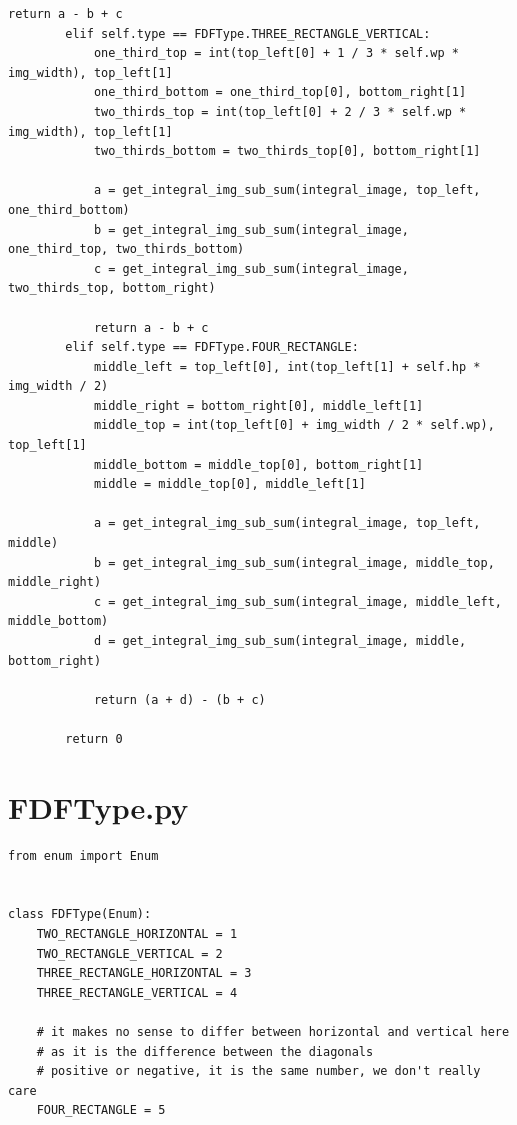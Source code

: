 \begin{lstlisting}[style=py]
            return a - b + c
        elif self.type == FDFType.THREE_RECTANGLE_VERTICAL:
            one_third_top = int(top_left[0] + 1 / 3 * self.wp * img_width), top_left[1]
            one_third_bottom = one_third_top[0], bottom_right[1]
            two_thirds_top = int(top_left[0] + 2 / 3 * self.wp * img_width), top_left[1]
            two_thirds_bottom = two_thirds_top[0], bottom_right[1]

            a = get_integral_img_sub_sum(integral_image, top_left, one_third_bottom)
            b = get_integral_img_sub_sum(integral_image, one_third_top, two_thirds_bottom)
            c = get_integral_img_sub_sum(integral_image, two_thirds_top, bottom_right)

            return a - b + c
        elif self.type == FDFType.FOUR_RECTANGLE:
            middle_left = top_left[0], int(top_left[1] + self.hp * img_width / 2)
            middle_right = bottom_right[0], middle_left[1]
            middle_top = int(top_left[0] + img_width / 2 * self.wp), top_left[1]
            middle_bottom = middle_top[0], bottom_right[1]
            middle = middle_top[0], middle_left[1]

            a = get_integral_img_sub_sum(integral_image, top_left, middle)
            b = get_integral_img_sub_sum(integral_image, middle_top, middle_right)
            c = get_integral_img_sub_sum(integral_image, middle_left, middle_bottom)
            d = get_integral_img_sub_sum(integral_image, middle, bottom_right)

            return (a + d) - (b + c)

        return 0

\end{lstlisting}

\section*{FDFType.py}

\begin{lstlisting}[style=py]
from enum import Enum


class FDFType(Enum):
    TWO_RECTANGLE_HORIZONTAL = 1
    TWO_RECTANGLE_VERTICAL = 2
    THREE_RECTANGLE_HORIZONTAL = 3
    THREE_RECTANGLE_VERTICAL = 4

    # it makes no sense to differ between horizontal and vertical here
    # as it is the difference between the diagonals
    # positive or negative, it is the same number, we don't really care
    FOUR_RECTANGLE = 5

\end{lstlisting}

